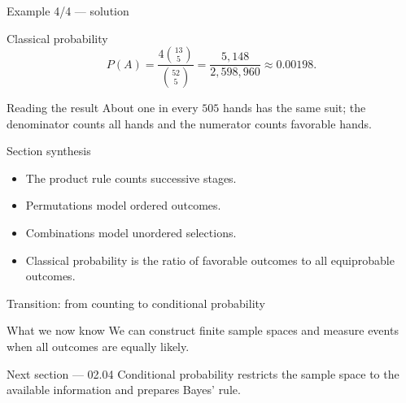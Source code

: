 \documentclass[10pt,aspectratio=169]{beamer}
\begin{document}
\begin{frame}{Example 4/4 --- solution}
  \footnotesize
  \begin{block}{Classical probability}
    \[
      P(A)=\frac{4\binom{13}{5}}{\binom{52}{5}}
      =\frac{5{,}148}{2{,}598{,}960}\approx0.00198.
    \]
  \end{block}
  \begin{exampleblock}{Reading the result}
    About one in every $505$ hands has the same suit; the denominator counts
    all hands and the numerator counts favorable hands.
  \end{exampleblock}
\end{frame}

\begin{frame}{Section synthesis}
  \small
  \begin{itemize}\itemsep=0.12cm
    \item The product rule counts successive stages.
    \item Permutations model ordered outcomes.
    \item Combinations model unordered selections.
    \item Classical probability is the ratio of favorable outcomes to all
      equiprobable outcomes.
  \end{itemize}
\end{frame}

\begin{frame}{Transition: from counting to conditional probability}
  \small
  \begin{block}{What we now know}
    We can construct finite sample spaces and measure events when all outcomes
    are equally likely.
  \end{block}
  \begin{alertblock}{Next section --- 02.04}
    Conditional probability restricts the sample space to the available
    information and prepares Bayes' rule.
  \end{alertblock}
\end{frame}
\end{document}
